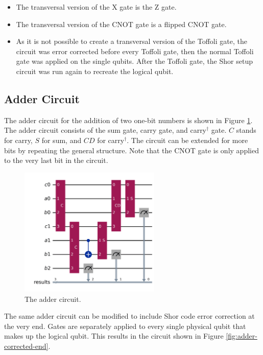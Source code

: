 \documentclass[letterpaper]{article}
\begin{document}
\begin{itemize}
    \item The transversal version of the X gate is the Z gate.
    \item The transversal version of the CNOT gate is a flipped CNOT gate.
    \item As it is not possible to create a transversal version of the Toffoli gate, the circuit was error corrected before every Toffoli gate, then the normal Toffoli gate was applied on the single qubits. After the Toffoli gate, the Shor setup circuit was run again to recreate the logical qubit.
\end{itemize}

\subsection{Adder Circuit}

The adder circuit for the addition of two one-bit numbers is shown in Figure \ref{fig:adder}. The adder circuit consists of the sum gate, carry gate, and carry\(^{\dagger}\) gate. \(C\) stands for carry, \(S\) for sum, and \(CD\) for carry\(^\dagger\). The circuit can be extended for more bits by repeating the general structure. Note that the CNOT gate is only applied to the very last bit in the circuit.

\begin{figure}[H]
    \centering
    \includegraphics[width=0.6\textwidth]{adder}
    \caption{The adder circuit.}
    \label{fig:adder}
\end{figure}

The same adder circuit can be modified to include Shor code error correction at the very end. Gates are separately applied to every single physical qubit that makes up the logical qubit.  This results in the circuit shown in Figure \ref{fig:adder-corrected-end}.
\end{document}
